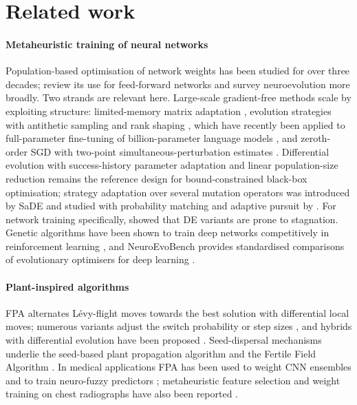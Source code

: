 \documentclass[10pt,letterpaper]{article}
\begin{document}
\section{Related work}\label{sec:related}

\paragraph{Metaheuristic training of neural networks} Population-based optimisation of network weights has been studied for over three decades; \citet{ojha2017metaheuristic} review its use for feed-forward networks and \citet{stanley2019neuroevolution} survey neuroevolution more broadly. Two strands are relevant here. Large-scale gradient-free methods scale by exploiting structure: limited-memory matrix adaptation \citep{loshchilov2019lmmaes}, evolution strategies with antithetic sampling and rank shaping \citep{salimans2017es}, which have recently been applied to full-parameter fine-tuning of billion-parameter language models \citep{qiu2025esllm}, and zeroth-order SGD with two-point simultaneous-perturbation estimates \citep{spall1992spsa,malladi2023mezo}. Differential evolution \citep{storn1997de} with success-history parameter adaptation \citep{zhang2009jade,tanabe2013shade} and linear population-size reduction \citep{tanabe2014lshade} remains the reference design for bound-constrained black-box optimisation; strategy adaptation over several mutation operators was introduced by SaDE \citep{qin2009sade} and studied with probability matching and adaptive pursuit by \citet{gong2011strategy}. For network training specifically, \citet{piotrowski2014stagnation} showed that DE variants are prone to stagnation. Genetic algorithms have been shown to train deep networks competitively in reinforcement learning \citep{such2017deep}, and NeuroEvoBench provides standardised comparisons of evolutionary optimisers for deep learning \citep{lange2023neuroevobench}.

\paragraph{Plant-inspired algorithms} FPA \citep{yang2012fpa} alternates Lévy-flight moves towards the best solution with differential local moves; numerous variants adjust the switch probability or step sizes \citep{abdelbasset2019fpareview}, and hybrids with differential evolution have been proposed \citep{song2024defpa}. Seed-dispersal mechanisms underlie the seed-based plant propagation algorithm \citep{sulaiman2015sbppa} and the Fertile Field Algorithm \citep{mohammadi2020ffa}. In medical applications FPA has been used to weight CNN ensembles \citep{zhou2025fpaensemble} and to train neuro-fuzzy predictors \citep{kaya2024fpaanfis}; metaheuristic feature selection and weight training on chest radiographs have also been reported \citep{elkenawy2021,almutairi2024}.
\end{document}
